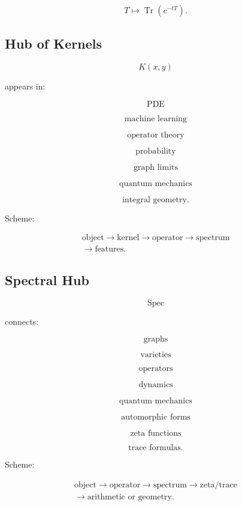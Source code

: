 \documentclass[11pt]{article}
\begin{document}
\[
T\mapsto \operatorname{Tr}(e^{-tT}).
\]



\subsection{Hub of Kernels}

\[
K(x,y)
\]

appears in:

\[
\text{PDE}
\]

\[
\text{machine learning}
\]

\[
\text{operator theory}
\]

\[
\text{probability}
\]

\[
\text{graph limits}
\]

\[
\text{quantum mechanics}
\]

\[
\text{integral geometry}.
\]

Scheme:

\[
\begin{gathered}
\text{object} \to \text{kernel} \to \text{operator} \to \text{spectrum} \\
\to \text{features}.
\end{gathered}
\]



\subsection{Spectral Hub}

\[
\operatorname{Spec}
\]

connects:

\[
\text{graphs}
\]

\[
\text{varieties}
\]

\[
\text{operators}
\]

\[
\text{dynamics}
\]

\[
\text{quantum mechanics}
\]

\[
\text{automorphic forms}
\]

\[
\text{zeta functions}
\]

\[
\text{trace formulas}.
\]

Scheme:

\[
\begin{gathered}
\text{object} \to \text{operator} \to \text{spectrum} \to \text{zeta/trace} \\
\to \text{arithmetic or geometry}.
\end{gathered}
\]
\end{document}
